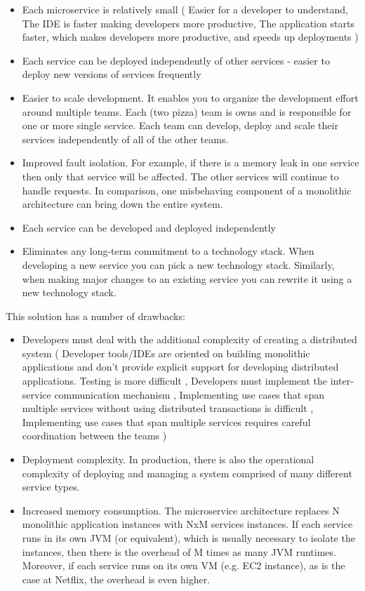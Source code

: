 \begin{itemize}
\item Each microservice is relatively small ( 
Easier for a developer to understand,
The IDE is faster making developers more productive,
The application starts faster, which makes developers more productive, and speeds up deployments )
\item Each service can be deployed independently of other services - easier to deploy new versions of services frequently

\item Easier to scale development. It enables you to organize the development effort around multiple teams. Each (two pizza) team is owns and is responsible for one or more single service. Each team can develop, deploy and scale their services independently of all of the other teams.

\item Improved fault isolation. For example, if there is a memory leak in one service then only that service will be affected. The other services will continue to handle requests. In comparison, one misbehaving component of a monolithic architecture can bring down the entire system.

\item Each service can be developed and deployed independently

\item Eliminates any long-term commitment to a technology stack. When developing a new service you can pick a new technology stack. Similarly, when making major changes to an existing service you can rewrite it using a new technology stack.
\end{itemize}



This solution has a number of drawbacks:
\begin{itemize}

\item Developers must deal with the additional complexity of creating a distributed system ( Developer tools/IDEs are oriented on building monolithic applications and don't provide explicit support for developing distributed applications.
Testing is more difficult ,
Developers must implement the inter-service communication mechanism ,
Implementing use cases that span multiple services without using distributed transactions is difficult ,
Implementing use cases that span multiple services requires careful coordination between the teams )
\item Deployment complexity. In production, there is also the operational complexity of deploying and managing a system comprised of many different service types.
\item Increased memory consumption. The microservice architecture replaces N monolithic application instances with NxM services instances. If each service runs in its own JVM (or equivalent), which is usually necessary to isolate the instances, then there is the overhead of M times as many JVM runtimes. Moreover, if each service runs on its own VM (e.g. EC2 instance), as is the case at Netflix, the overhead is even higher.
\end{itemize}

